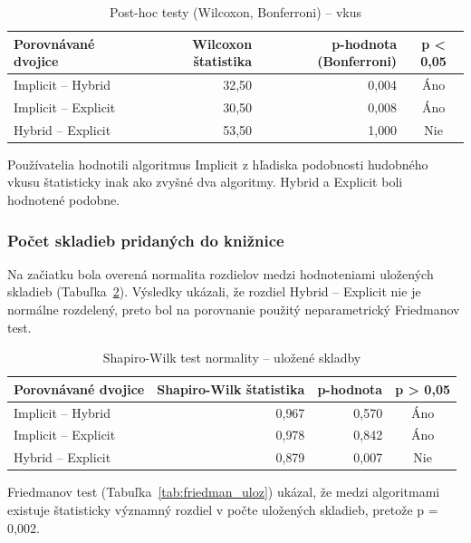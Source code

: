 \begin{table}[h!]
  \caption{Post-hoc testy (Wilcoxon, Bonferroni) – vkus}
  \label{tab:posthoc_vkus}
  \centering
  \begin{tabular}{@{}lrrc@{}}
    \toprule
    \textbf{Porovnávané dvojice} & \textbf{Wilcoxon štatistika} & \textbf{p-hodnota (Bonferroni)} & \textbf{p < 0{,}05} \\
    \midrule
    Implicit -- Hybrid & 32{,}50 & 0{,}004 & Áno \\
    Implicit -- Explicit & 30{,}50 & 0{,}008 & Áno \\
    Hybrid -- Explicit & 53{,}50 & 1{,}000 & Nie \\
    \bottomrule
  \end{tabular}
\end{table}

Používatelia hodnotili algoritmus Implicit z hľadiska podobnosti hudobného vkusu štatisticky inak ako zvyšné dva algoritmy. Hybrid a Explicit boli hodnotené podobne.


\subsubsection{Počet skladieb pridaných do knižnice}
Na začiatku bola overená normalita rozdielov medzi hodnoteniami uložených skladieb (Tabuľka~\ref{tab:shw_uloz}). Výsledky ukázali, že rozdiel Hybrid – Explicit nie je normálne rozdelený, preto bol na porovnanie použitý neparametrický Friedmanov test.

\begin{table}[h!]
  \caption{Shapiro-Wilk test normality – uložené skladby}
  \label{tab:shw_uloz}
  \centering
  \begin{tabular}{@{}lrrc@{}}
    \toprule
    \textbf{Porovnávané dvojice} & \textbf{Shapiro-Wilk štatistika} & \textbf{p-hodnota} & \textbf{p > 0{,}05} \\
    \midrule
    Implicit -- Hybrid & 0{,}967 & 0{,}570 & Áno \\
    Implicit -- Explicit & 0{,}978 & 0{,}842 & Áno \\
    Hybrid -- Explicit & 0{,}879 & 0{,}007 & Nie \\
    \bottomrule
  \end{tabular}
\end{table}

Friedmanov test (Tabuľka~\ref{tab:friedman_uloz}) ukázal, že medzi algoritmami existuje štatisticky významný rozdiel v počte uložených skladieb, pretože p = 0{,}002.

